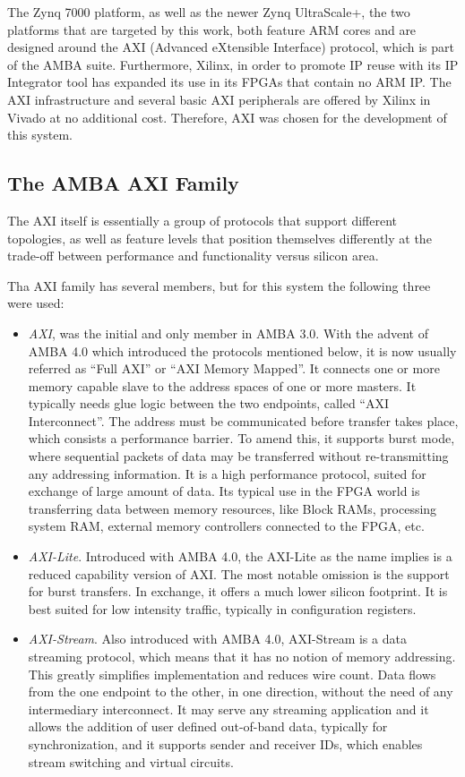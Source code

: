 The Zynq 7000 platform, as well as the newer Zynq UltraScale+, the two platforms that are targeted by this work,
both feature ARM cores and are designed around the AXI (Advanced eXtensible Interface) protocol, 
which is part of the AMBA suite. 
Furthermore, Xilinx, in order to promote IP reuse with its IP Integrator tool has expanded its use
in its FPGAs that contain no ARM IP. The AXI infrastructure and several basic AXI peripherals
are offered by Xilinx in Vivado at no additional cost.
Therefore, AXI was chosen for the development of this system.

\subsection{The AMBA AXI Family}

The AXI itself is essentially a group of protocols that support different topologies,
as well as feature levels that position themselves differently at the trade-off 
between performance and functionality versus silicon area.

Tha AXI family has several members, but for this system the following three were used:
\begin{itemize}
\item	\textit{AXI}, was the initial and only member in AMBA 3.0. With the advent of AMBA 4.0 which introduced
	the protocols mentioned below, it is now usually referred as ``Full AXI'' or ``AXI Memory Mapped''.
	It connects one or more memory capable slave to the address spaces of 
	one or more masters. It typically needs glue logic between the two endpoints, called ``AXI Interconnect''. 
	The address must be communicated before transfer takes place, which consists a performance barrier.
	To amend this, it supports burst mode, where sequential packets of data may be transferred without
	re-transmitting any addressing information. It is a high performance protocol, suited for exchange
	of large amount of data. Its typical use in the FPGA world is transferring data between memory resources,
 	like Block RAMs, processing system RAM, external memory controllers connected to the FPGA, etc.
\item	\textit{AXI-Lite}. Introduced with AMBA 4.0, the AXI-Lite as the  name implies is a reduced capability
	version of AXI. The most notable omission is the support for burst transfers. In exchange, it offers
	a much lower silicon footprint. It is best suited for low intensity traffic, typically in configuration
	registers.
\item	\textit{AXI-Stream}. Also introduced with AMBA 4.0, AXI-Stream is a data streaming protocol, which means
	that it has no notion of memory addressing. This greatly simplifies implementation and reduces wire
	count. Data flows from the one endpoint to the other, in one direction, 
	without the need of any intermediary interconnect.
	It may serve any streaming application and it allows the addition of user defined out-of-band data,
	typically for synchronization, and it supports sender and receiver IDs, 
	which enables stream switching and virtual circuits.
\end{itemize}

